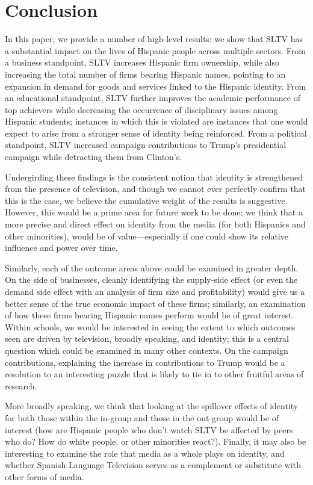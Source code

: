 \documentclass[11pt]{article}
\begin{document}
\section{Conclusion} \label{secconcl}

In this paper, we provide a number of high-level results: we show that SLTV has a substantial impact on the lives of Hispanic people across multiple sectors. From a business standpoint, SLTV increases Hispanic firm ownership, while also increasing the total number of firms bearing Hispanic names, pointing to an expansion in demand for goods and services linked to the Hispanic identity. From an educational standpoint, SLTV further improves the academic performance of top achievers while decreasing the occurrence of disciplinary issues among Hispanic students; instances in which this is violated are instances that one would expect to arise from a stronger sense of identity being reinforced. From a political standpoint, SLTV increased campaign contributions to Trump's presidential campaign while detracting them from Clinton's.

Undergirding these findings is the consistent notion that identity is strengthened from the presence of television, and though we cannot ever perfectly confirm that this is the case, we believe the cumulative weight of the results is suggestive. However, this would be a prime area for future work to be done: we think that a more precise and direct effect on identity from the media (for both Hispanics and other minorities), would be of value---especially if one could show its relative influence and power over time.

Similarly, each of the outcome areas above could be examined in greater depth. On the side of businesses, cleanly identifying the supply-side effect (or even the demand side effect with an analysis of firm size and profitability) would give us a better sense of the true economic impact of these firms; similarly, an examination of how these firms bearing Hispanic names perform would be of great interest. Within schools, we would be interested in seeing the extent to which outcomes seen are driven by television, broadly speaking, and identity; this is a central question which could be examined in many other contexts. On the campaign contributions, explaining the increase in contributions to Trump would be a resolution to an interesting puzzle that is likely to tie in to other fruitful areas of research.

More broadly speaking, we think that looking at the spillover effects of identity for both those within the in-group and those in the out-group would be of interest (how are Hispanic people who don't watch SLTV be affected by peers who do? How do white people, or other minorities react?). Finally, it may also be interesting to examine the role that media as a whole plays on identity, and whether Spanish Language Television serves as a complement or substitute with other forms of media.
\end{document}
